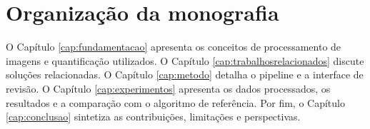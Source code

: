 \section{Organização da monografia}

O Capítulo \ref{cap:fundamentacao} apresenta os conceitos de processamento de imagens e quantificação utilizados. O Capítulo \ref{cap:trabalhosrelacionados} discute soluções relacionadas. O Capítulo \ref{cap:metodo} detalha o pipeline e a interface de revisão. O Capítulo \ref{cap:experimentos} apresenta os dados processados, os resultados e a comparação com o algoritmo de referência. Por fim, o Capítulo \ref{cap:conclusao} sintetiza as contribuições, limitações e perspectivas.
